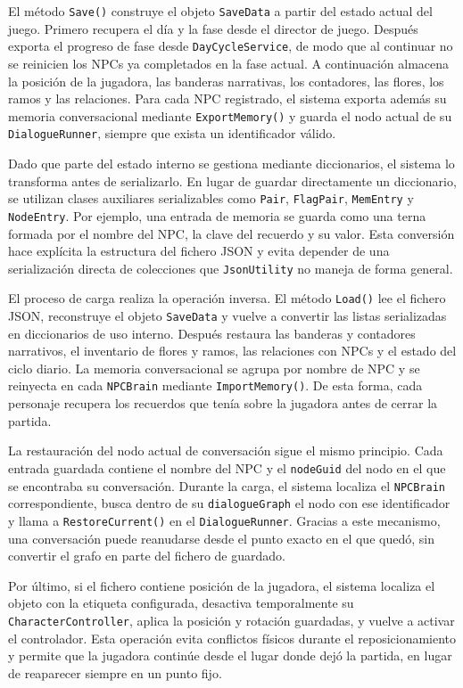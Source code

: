 \documentclass[12pt,twoside,titlepage]{report}
\begin{document}
El método \texttt{Save()} construye el objeto \texttt{SaveData} a partir del estado actual del juego. Primero recupera el día y la fase desde el director de juego. Después exporta el progreso de fase desde \texttt{DayCycleService}, de modo que al continuar no se reinicien los NPCs ya completados en la fase actual. A continuación almacena la posición de la jugadora, las banderas narrativas, los contadores, las flores, los ramos y las relaciones. Para cada NPC registrado, el sistema exporta además su memoria conversacional mediante \texttt{ExportMemory()} y guarda el nodo actual de su \texttt{DialogueRunner}, siempre que exista un identificador válido.

Dado que parte del estado interno se gestiona mediante diccionarios, el sistema lo transforma antes de serializarlo. En lugar de guardar directamente un diccionario, se utilizan clases auxiliares serializables como \texttt{Pair}, \texttt{FlagPair}, \texttt{MemEntry} y \texttt{NodeEntry}. Por ejemplo, una entrada de memoria se guarda como una terna formada por el nombre del NPC, la clave del recuerdo y su valor. Esta conversión hace explícita la estructura del fichero JSON y evita depender de una serialización directa de colecciones que \texttt{JsonUtility} no maneja de forma general.

El proceso de carga realiza la operación inversa. El método \texttt{Load()} lee el fichero JSON, reconstruye el objeto \texttt{SaveData} y vuelve a convertir las listas serializadas en diccionarios de uso interno. Después restaura las banderas y contadores narrativos, el inventario de flores y ramos, las relaciones con NPCs y el estado del ciclo diario. La memoria conversacional se agrupa por nombre de NPC y se reinyecta en cada \texttt{NPCBrain} mediante \texttt{ImportMemory()}. De esta forma, cada personaje recupera los recuerdos que tenía sobre la jugadora antes de cerrar la partida.

La restauración del nodo actual de conversación sigue el mismo principio. Cada entrada guardada contiene el nombre del NPC y el \texttt{nodeGuid} del nodo en el que se encontraba su conversación. Durante la carga, el sistema localiza el \texttt{NPCBrain} correspondiente, busca dentro de su \texttt{dialogueGraph} el nodo con ese identificador y llama a \texttt{RestoreCurrent()} en el \texttt{DialogueRunner}. Gracias a este mecanismo, una conversación puede reanudarse desde el punto exacto en el que quedó, sin convertir el grafo en parte del fichero de guardado.

Por último, si el fichero contiene posición de la jugadora, el sistema localiza el objeto con la etiqueta configurada, desactiva temporalmente su \texttt{CharacterController}, aplica la posición y rotación guardadas, y vuelve a activar el controlador. Esta operación evita conflictos físicos durante el reposicionamiento y permite que la jugadora continúe desde el lugar donde dejó la partida, en lugar de reaparecer siempre en un punto fijo.
\end{document}

